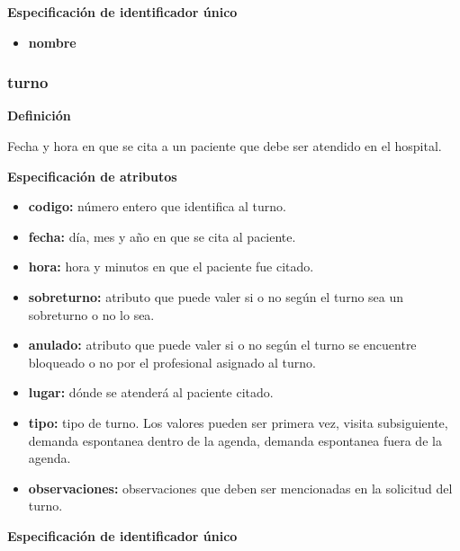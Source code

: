 \documentclass[a4paper,11pt]{article}
\begin{document}
\textbf{Especificación de identificador único}

\begin{itemize}

     \item \textbf{nombre}

\end{itemize}

\subsubsection{\textbf{turno}}

\textbf{Definición}

Fecha y hora en que se cita a un paciente que debe ser atendido en el hospital.

\textbf{Especificación de atributos}

\begin{itemize}

     \item \textbf{codigo:} número entero que identifica al turno.

     \item \textbf{fecha:} día, mes y año en que se cita al paciente.

     \item \textbf{hora:} hora y minutos en que el paciente fue citado.

     \item \textbf{sobreturno:} atributo que puede valer si o no según el turno sea un sobreturno 
     o no lo sea.

     \item \textbf{anulado:} atributo que puede valer si o no según el turno se encuentre bloqueado 
     o no por el profesional asignado al turno.

     \item \textbf{lugar:} dónde se atenderá al paciente citado.

     \item \textbf{tipo:} tipo de turno. Los valores pueden ser primera vez, visita subsiguiente, 
     demanda espontanea dentro de la agenda, demanda espontanea fuera de la agenda.

     \item \textbf{observaciones:} observaciones que deben ser mencionadas en la solicitud del turno.

\end{itemize}

\textbf{Especificación de identificador único}
\end{document}
